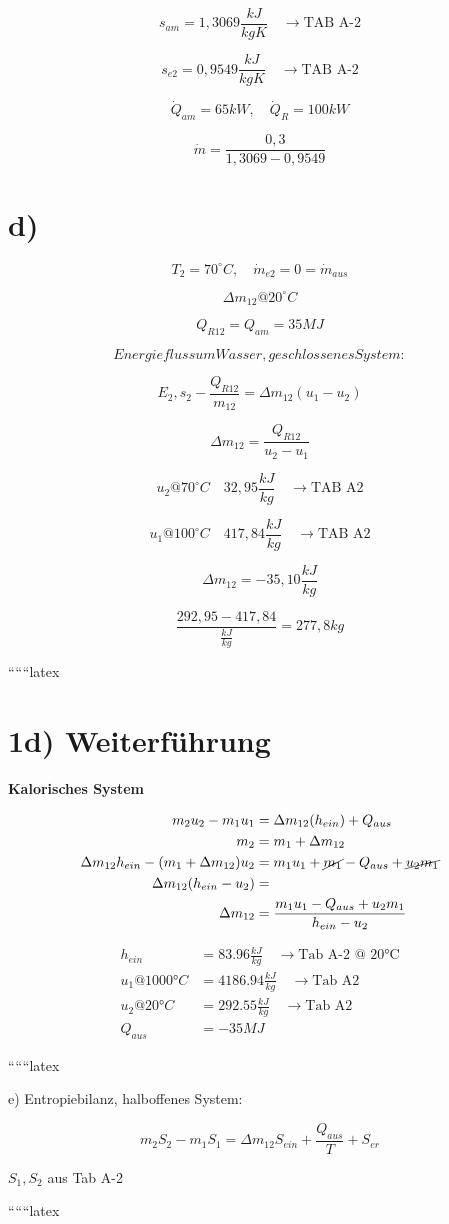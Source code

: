 \[
s_{am} = 1{,}3069 \frac{kJ}{kgK} \quad \rightarrow \text{TAB A-2}
\]

\[
s_{e2} = 0{,}9549 \frac{kJ}{kgK} \quad \rightarrow \text{TAB A-2}
\]

\[
\dot{Q}_{am} = 65 kW, \quad \dot{Q}_R = 100 kW
\]

\[
\dot{m} = \frac{0{,}3}{1{,}3069 - 0{,}9549}
\]

\section*{d)}

\[
T_2 = 70^\circ C, \quad \dot{m}_{e2} = 0 = \dot{m}_{aus}
\]

\[
\Delta m_{12} @ 20^\circ C
\]

\[
Q_{R12} = Q_{am} = 35 MJ
\]

\[
Energiefluss um Wasser, geschlossenes System:
\]

\[
E_2, s_2 - \frac{Q_{R12}}{m_{12}} = \Delta m_{12} (u_1 - u_2)
\]

\[
\Delta m_{12} = \frac{Q_{R12}}{u_2 - u_1}
\]

\[
u_2 @ 70^\circ C \quad 32{,}95 \frac{kJ}{kg} \quad \rightarrow \text{TAB A2}
\]

\[
u_1 @ 100^\circ C \quad 417{,}84 \frac{kJ}{kg} \quad \rightarrow \text{TAB A2}
\]

\[
\Delta m_{12} = -35{,}10 \frac{kJ}{kg}
\]

\[
\frac{292{,}95 - 417{,}84}{\frac{kJ}{kg}} = 277{,}8 kg
\]

``````latex


\section*{1d) Weiterführung}

\textbf{Kalorisches System}

\begin{align*}
m_2 u_2 - m_1 u_1 &= \Delta m_{12} (h_{ein}) + Q_{aus} \\
m_2 &= m_1 + \Delta m_{12} \\
\Delta m_{12} h_{ein} - (m_1 + \Delta m_{12}) u_2 &= m_1 u_1 + \cancel{m_1} - Q_{aus} + \cancel{u_2 m_1} \\
\Delta m_{12} (h_{ein} - u_2) &= \\
\Delta m_{12} &= \frac{m_1 u_1 - Q_{aus} + u_2 m_1}{h_{ein} - u_2}
\end{align*}

\begin{align*}
h_{ein} &= 83.96 \frac{kJ}{kg} \quad \rightarrow \text{Tab A-2 @ 20°C} \\
u_1 @ 1000°C &= 4186.94 \frac{kJ}{kg} \quad \rightarrow \text{Tab A2} \\
u_2 @ 20°C &= 292.55 \frac{kJ}{kg} \quad \rightarrow \text{Tab A2} \\
Q_{aus} &= -35 MJ
\end{align*}

``````latex


e) Entropiebilanz, halboffenes System:

\[
m_2 S_2 - m_1 S_1 = \Delta m_{12} S_{ein} + \frac{Q_{aus}}{T} + S_{er}
\]

$S_1, S_2$ aus Tab A-2

``````latex


